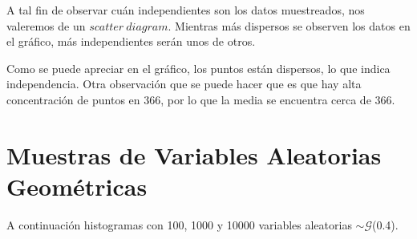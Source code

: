 \documentclass[a4paper,10pt]{article}
\begin{document}
A tal fin de observar cuán independientes son los datos muestreados, nos valeremos de un $scatter \ diagram$.
Mientras más dispersos se observen los datos en el gráfico, más independientes serán unos de otros.


\begin{figure}[hbt]
\noindent{}
\end{figure}

Como se puede apreciar en el gráfico, los puntos están dispersos, lo que indica independencia.
Otra observación que se puede hacer que es que hay alta concentración de puntos en 366, por lo que la media
se encuentra cerca de 366.

\pagebreak

\section*{Muestras de Variables Aleatorias Geométricas}

A continuación histogramas con 100, 1000 y 10000 variables aleatorias $\sim \mathcal{G}$(0.4).


\begin{figure}[hbt]
\noindent{}
\end{figure}
\end{document}
